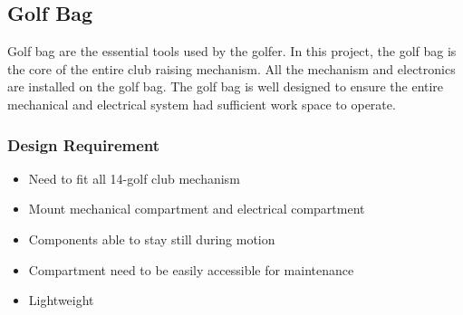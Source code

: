 \documentclass[11pt,landscape]{article}
\begin{document}
\begin{multicols}{3}
    \subsection{Golf Bag}
    Golf bag are the essential tools used by the golfer. In this project, the
    golf bag is the core of the entire club raising mechanism. All the mechanism
    and electronics are installed on the golf bag. The golf bag is well designed
    to ensure the entire mechanical and electrical system had sufficient work
    space to operate. 
    
    \subsubsection{Design Requirement}
    \begin{itemize}
        \item Need to fit all 14-golf club mechanism
        \item Mount mechanical compartment and electrical compartment
        \item Components able to stay still during motion
        \item Compartment need to be easily accessible for maintenance
        \item Lightweight 
    \end{itemize}
    

\end{multicols}
\end{document}
